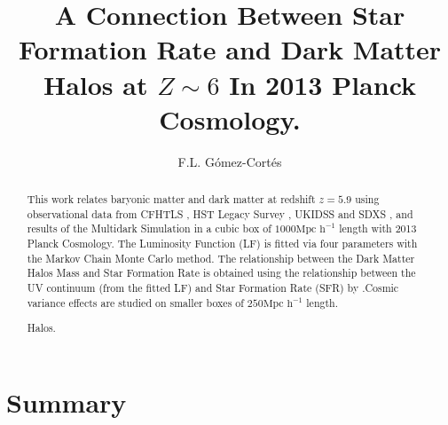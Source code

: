 \documentclass[manuscript]{aastex}
\begin{document}
\title{A Connection Between Star Formation Rate and Dark Matter Halos at 
$Z\sim6$ In 2013 Planck Cosmology.}

\author{F.L. G\'omez-Cort\'es }

\begin{abstract}
This work relates baryonic matter and dark matter at redshift $z=5.9$ using 
observational data from CFHTLS \citep{willott13}, HST Legacy Survey
\citep{bouwens14,finkelstein14}, UKIDSS and SDXS \citep{mclure09}, and results of 
the Multidark Simulation \citep{riebe13} in a cubic box of $1000 \textrm{Mpc 
h}^{-1}$ length with 2013 Planck Cosmology. The Luminosity Function (LF) is 
fitted via four parameters with the Markov Chain Monte Carlo method. The 
relationship between the Dark Matter Halos Mass and Star Formation Rate is 
obtained using the relationship between the UV  continuum (from the fitted LF) 
and Star Formation Rate (SFR) by \cite{kennicutt98}.Cosmic variance effects are 
studied on smaller boxes of $250 \textrm{Mpc h}^{-1}$ length.

Halos.
\end{abstract}

%











\section{Summary}


\acknowledgments
%
\appendix



\end{document}
